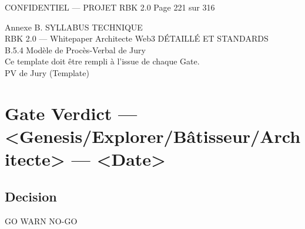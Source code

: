 \vspace{0.5em}
\begin{confidential}CONFIDENTIEL — PROJET RBK 2.0                                 Page 221 sur 316\end{confidential}
Annexe B. SYLLABUS TECHNIQUE\\
RBK 2.0 — Whitepaper Architecte Web3                                                  DÉTAILLÉ ET STANDARDS\\
\vspace{0.5em}
\vspace{0.5em}
B.5.4 Modèle de Procès-Verbal de Jury\\
Ce template doit être rempli à l’issue de chaque Gate.\\
\vspace{0.5em}
PV de Jury (Template)\\
\vspace{0.5em}
\section*{Gate Verdict --- \textless{}Genesis/Explorer/Bâtisseur/Architecte\textgreater{} --- \textless{}Date\textgreater{}}
\vspace{0.5em}
\vspace{0.5em}
\subsection*{Decision}
GO \textbar{} WARN \textbar{} NO-GO\\
\vspace{0.5em}
\vspace{0.5em}
